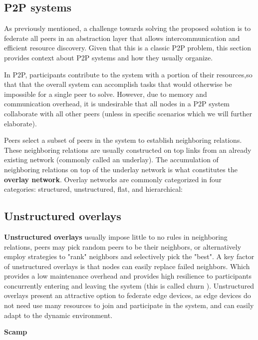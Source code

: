 
\subsection{P2P systems}

As previously mentioned, a challenge towards solving the proposed solution is to federate all peers in an abstraction layer that allows intercommunication and efficient resource discovery. Given that this is a classic P2P problem, this section provides context about P2P systems and how they usually organize.

In P2P, participants contribute to the system with a portion of their resources,so that that the overall system can accomplish tasks that would otherwise be impossible for a single peer to solve. However, due to memory and communication overhead, it is undesirable that all nodes in a P2P system collaborate with all other peers (unless in specific scenarios which we will further elaborate). 

Peers select a subset of peers in the system to establish neighboring relations. These neighboring relations are usually constructed on top links from an already existing network (commonly called an underlay). The accumulation of neighboring relations on top of the underlay network is what constitutes the \textbf{overlay network}. Overlay networks are commonly categorized in four categories: structured, unstructured, flat, and hierarchical:

\subsection{Unstructured overlays}

\textbf{Unstructured overlays} usually impose little to no rules in neighboring relations, peers may pick random peers to be their neighbors, or alternatively employ strategies to "rank" neighbors and selectively pick the "best". A key factor of unstructured overlays is that nodes can easily replace failed neighbors. Which provides a low maintenance overhead and provides high resilience to participants concurrently entering and leaving the system (this is called churn \cite{stutzbach2006understanding}). Unstructured overlays present an attractive option to federate edge devices, as edge devices do not need use many resources to join and participate in the system, and can easily adapt to the dynamic environment.

\textbf{Scamp}

